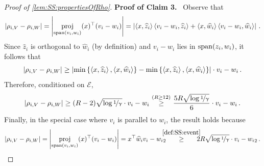 \documentclass[11pt,letterpaper]{article}
\DeclareMathOperator{\proj}{proj}
\theoremstyle{plain}
\theoremstyle{definition}
\theoremstyle{remark}
\newcommand{\Stackrel}[2]{\stackrel{\mathmakebox[\widthof{\ensuremath{#2}}]{#1}}{#2}}
\def\abs#1{\left| #1 \right|}
\newcommand{\inbrace}[1]{\ensuremath{\left\{#1\right\}}}
\newcommand{\sinangle}[1]{\ensuremath{\langle#1\rangle}}
\newcommand{\inangle}[1]{\left\langle#1\right\rangle}
\let\norm\relax
\newcommand{\norm}[1]{\ensuremath{\left\lVert #1 \right\rVert}}
\newcommand{\evE}{\ensuremath{\mathscr{E}}}
\newcommand{\nfrac}[2]{\nicefrac{#1}{#2}}
\newcommand{\wh}[1]{\widehat{#1}}
\renewcommand{\paragraph}[1]{\medskip \noindent\textbf{#1}~}
\renewcommand{\gamma}{\upgamma}
\begin{document}
{{{\begin{proof}[Proof of \cref{lem:SS:propertiesOfRho}]
            \paragraph{Proof of Claim 3.}
                Observe that 
                \[
                    \abs{\rho_{i,V} - \rho_{i,W}}
                    = \abs{\proj_{{\rm span}(v_i,w_i)}(x)^\top (v_i -w_i)}
                    = 
                    \abs{\inangle{x,\wh{z}_i} \sinangle{v_i -w_i,\wh{z}_i}
                    +
                    \inangle{x,\wh{w}_i} \sinangle{v_i -w_i,\wh{w}_i}}\,.
                \]
                Since $\wh{z}_i$ is orthogonal to $\wh{w}_i$ (by definition) and $v_i-w_i$ lies in ${\rm span}(z_i,w_i)$, it follows that 
                \[
                    \abs{\rho_{i,V} - \rho_{i,W}}
                    \geq 
                    \abs{
                        \min\inbrace{
                        \inangle{x,\wh{z}_i},
                        \inangle{x,\wh{w}_i}
                        } 
                        - 
                        \min\inbrace{
                            \inangle{x,\wh{z}_i},
                            \inangle{x,\wh{w}_i}
                        }
                    }\cdot \norm{v_i - w_i}\,.
                \]
                Therefore, conditioned on $\evE$,
                \[
                    \abs{\rho_{i,V} - \rho_{i,W}}
                    \geq (R-2)\sqrt{\log{\nfrac{1}{\gamma}}}\cdot \norm{v_i - w_i}
                    ~~~\Stackrel{(R\geq 12)}{\geq}~~~ \frac{5R\sqrt{\log{\nfrac{1}{\gamma}}}}{6}\cdot \norm{v_i - w_i}\,.
                \]
                Finally, in the special case where $v_i$ is parallel to $w_i$, the result holds because 
                \[
                    \abs{\rho_{i,V} - \rho_{i,W}}
                    = \abs{\proj_{{\rm span}(v_i,w_i)}(x)^\top (v_i -w_i)}
                    = x^\top \wh{w}_i \norm{v_i - w_i}_2
                    ~~\quad\Stackrel{\rm\cref{def:SS:event}}{\geq}\quad~~ 2R\sqrt{\log{\nfrac{1}{\gamma}}}\cdot \norm{v_i - w_i}_2\,.
                \]
                

                
            \end{proof}
            
}}}
\end{document}
